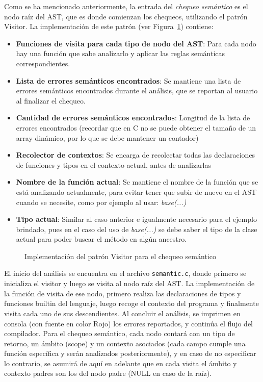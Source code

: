 \documentclass{llncs}
\begin{document}
Como se ha mencionado anteriormente, la entrada del \textit{chequeo semántico} es el nodo raíz del AST, que es donde comienzan los chequeos, utilizando el
patrón Visitor. La implementación de este patrón (ver Figura~\ref{fig:visitor}) contiene: 
\begin{itemize}
    \item \textbf{Funciones de visita para cada tipo de nodo del AST}: Para cada nodo hay una función que sabe analizarlo y aplicar las reglas semánticas correspondientes.
    \item \textbf{Lista de errores semánticos encontrados}: Se mantiene una lista de errores semánticos encontrados durante el análisis, que se reportan al usuario al finalizar el chequeo.
    \item \textbf{Cantidad de errores semánticos encontrados}: Longitud de la lista de errores encontrados (recordar que en C no se puede obtener el tamaño de un array dinámico, por lo que se debe mantener un contador)
    \item \textbf{Recolector de contextos}: Se encarga de recolectar todas las declaraciones de funciones y tipos en el contexto actual, antes de analizarlas
    \item \textbf{Nombre de la función actual}: Se mantiene el nombre de la función que se está analizando actualmente, para evitar tener que subir de nuevo en el AST cuando se necesite, como por ejemplo al usar: \textit{base(...)}
    \item \textbf{Tipo actual}: Similar al caso anterior e igualmente necesario para el ejemplo brindado, pues en el caso del uso de \textit{base(...)} se debe saber el tipo de la clase actual para poder buscar el método en algún ancestro.
\end{itemize}

\begin{figure}[h]
\centering
\caption{Implementación del patrón Visitor para el chequeo semántico}
\label{fig:visitor}
\end{figure}

El inicio del análisis se encuentra en el archivo \texttt{semantic.c}, donde primero se inicializa el visitor y luego se visita al nodo raíz del AST. La implementación de la función de
visita de ese nodo, primero realiza las declaraciones de tipos y funciones builtin del lenguaje, luego recoge el contexto del programa y finalmente visita cada uno de sus
descendientes. Al concluir el análisis, se imprimen en consola (con fuente en color Rojo) los errores reportados, y continúa el flujo del compilador. 
Para el chequeo semántico, cada nodo contará con un tipo de retorno, un ámbito (scope) y un contexto asociados (cada campo cumple una función específica y serán analizados posteriormente), y en caso de no
especificar lo contrario, se asumirá de aquí en adelante que en cada visita el ámbito y contexto padres son los del nodo padre (NULL en caso de la raíz).
\end{document}
